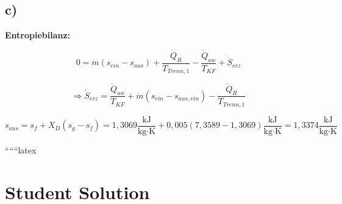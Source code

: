 

\subsection*{c)}

\textbf{Entropiebilanz:}

\begin{equation*}
0 = \dot{m} (s_{ein} - s_{aus}) + \frac{\dot{Q}_R}{T_{Trenn,1}} - \frac{\dot{Q}_{aw}}{T_{KF}} + \dot{S}_{erz}
\end{equation*}

\begin{equation*}
\Rightarrow \dot{S}_{erz} = \frac{\dot{Q}_{aw}}{T_{KF}} + \dot{m} \left( s_{ein} - s_{aus,ein} \right) - \frac{\dot{Q}_R}{T_{Trenn,1}}
\end{equation*}

\begin{equation*}
s_{aus} = s_f + X_D (s_g - s_f) = 1,3069 \frac{\text{kJ}}{\text{kg} \cdot \text{K}} + 0,005 (7,3589 - 1,3069) \frac{\text{kJ}}{\text{kg} \cdot \text{K}} = 1,3374 \frac{\text{kJ}}{\text{kg} \cdot \text{K}}
\end{equation*}

``````latex


\section*{Student Solution}